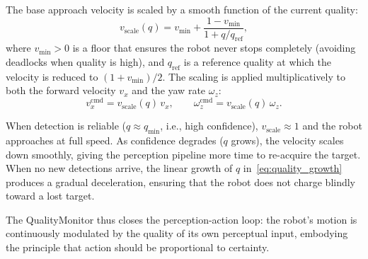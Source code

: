 The base approach velocity is scaled by a smooth function of the current
quality:
\begin{equation}
  v_{\mathrm{scale}}(q) =
  v_{\min} + \frac{1 - v_{\min}}{1 + q / q_{\mathrm{ref}}},
  \label{eq:velocity_scale}
\end{equation}
where $v_{\min} > 0$ is a floor that ensures the robot never stops
completely (avoiding deadlocks when quality is high), and $q_{\mathrm{ref}}$
is a reference quality at which the velocity is reduced to
$(1 + v_{\min})/2$. The scaling is applied multiplicatively to both the
forward velocity $v_x$ and the yaw rate $\omega_z$:
\begin{equation}
  v_x^{\mathrm{cmd}} = v_{\mathrm{scale}}(q)\,v_x, \qquad
  \omega_z^{\mathrm{cmd}} = v_{\mathrm{scale}}(q)\,\omega_z.
  \label{eq:cmd_vel_scaled}
\end{equation}

When detection is reliable ($q \approx q_{\min}$, i.e., high confidence),
$v_{\mathrm{scale}} \approx 1$ and the robot approaches at full speed.
As confidence degrades ($q$ grows), the velocity scales down smoothly,
giving the perception pipeline more time to re-acquire the target. When
no new detections arrive, the linear growth of $q$ in~\eqref{eq:quality_growth}
produces a gradual deceleration, ensuring that the robot does not charge
blindly toward a lost target.

The QualityMonitor thus closes the perception-action loop: the robot's
motion is continuously modulated by the quality of its own perceptual input,
embodying the principle that action should be proportional to certainty.
